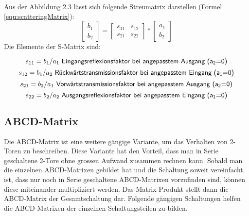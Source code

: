 Aus der Abbildung 2.3 lässt sich folgende Streumatrix darstellen (Formel \ref{equ:scatteringMatrix}):
\begin{equation}\label{equ:scatteringMatrix}
	\left[
		\begin{matrix}b_1 \\ b_2 \end{matrix}
	\right]
 	=
 	\left[
 		\begin{matrix}
			s_{11}&s_{12} \\s_{21}&s_{22}
		\end{matrix}
	\right]
	* 
	\left[
		\begin{matrix}
			a_1\\b_2
		\end{matrix}
	\right]
\end{equation}
Die Elemente der S-Matrix sind:

\begin{equation}\label{equ:def_s11}
	s_{11} = b_1/a_1\textsf{ Eingangsreflexionsfaktor bei angepasstem Ausgang (a\textsubscript{2}=0)}
\end{equation}
\begin{equation}\label{equ:def_s12}
	s_{12} = b_1/a_2\textsf{ Rückwärtstransmissionsfaktor bei angepasstem Eingang (a\textsubscript{1}=0)}
\end{equation}
\begin{equation}\label{equ:def_s21}
	s_{21} = b_2/a_1\textsf{ Vorwärtstransmissionsfaktor bei angepasstem Ausgang (a\textsubscript{2}=0)}
\end{equation}
\begin{equation}\label{equ:def_s22}
	s_{22} = b_2/a_2\textsf{ Ausgangsreflexionsfaktor bei angepasstem Eingang (a\textsubscript{1}=0)}
\end{equation}
\newpage

\subsection{ABCD-Matrix}\label{ABCD-Matrix}
Die ABCD-Matrix ist eine weitere gängige Variante, um das Verhalten von 2-Toren zu beschreiben. Diese Variante hat den Vorteil, dass man in Serie 
geschaltene 2-Tore ohne grossen Aufwand zusammen rechnen kann. Sobald man die einzelnen ABCD-Matrixen gebildet hat und die Schaltung soweit vereinfacht ist, dass nur noch in Serie geschaltene ABCD-Matrixen vorzufinden sind, können diese miteinander multipliziert werden. Das Matrix-Produkt stellt dann die ABCD-Matrix der Gesamtschaltung dar. Folgende gängigen Schaltungen helfen die ABCD-Matrixen der einzelnen Schaltungsteilen zu bilden.

